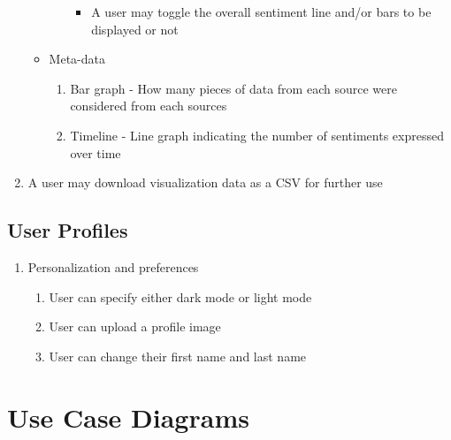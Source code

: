 \documentclass[12pt]{article}
\begin{document}
\begin{enumerate}
\begin{itemize}
\begin{enumerate}
\begin{itemize}
                    \item A user may toggle the overall sentiment line and/or bars to be displayed or not
                  \end{itemize}
                \end{enumerate}      
          \item Meta-data
                \begin{enumerate}
                  \item Bar graph - How many pieces of data from each source were considered from each sources
                  \item Timeline - Line graph indicating the number of sentiments expressed over time
                \end{enumerate}
        \end{itemize}
  \item A user may download visualization data as a CSV for further use
\end{enumerate}



\subsection{User Profiles}
\begin{enumerate}
  \item Personalization and preferences
        \begin{enumerate}
          \item User can specify either dark mode or light mode
          \item User can upload a profile image
          \item User can change their first name and last name
        \end{enumerate}
\end{enumerate}

\newpage
\section{Use Case Diagrams}
\end{document}
